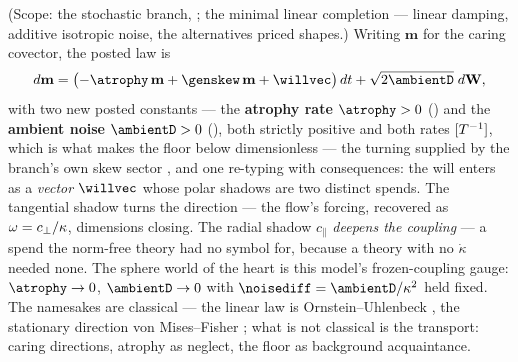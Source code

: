 \documentclass[../main]{subfiles}
\begin{document}
\begin{definition}%
%
  (Scope: the stochastic branch, ; the minimal linear completion ---
  linear damping, additive isotropic noise, the alternatives priced shapes.) Writing
  $\mathbf m$ for the caring covector, the posted law is
  \begin{equation}
    d\mathbf m
      =\bigl(-\atrophy\,\mathbf m+\genskew\,\mathbf m+\willvec\bigr)\,dt
      +\sqrt{2\ambientD}\;d\mathbf W,
    \label{eq:dyn:polar}
  \end{equation}
  with two new posted constants --- the \textbf{atrophy rate} $\atrophy>0$ ()
  and the \textbf{ambient noise} $\ambientD>0$ (), both strictly positive and
  both rates $[T\sp{-1}]$, which is what makes the floor below dimensionless --- the
  turning supplied by
  the branch's own skew sector , and one re-typing with consequences:
  the will enters as a \emph{vector} $\willvec$ whose polar shadows are two distinct
  spends. The tangential shadow turns the direction --- the flow's forcing, recovered
  as $\omega=c_{\perp}/\kappa$, dimensions closing. The radial shadow $c_{\parallel}$
  \emph{deepens the coupling} --- a spend the norm-free theory had no symbol for,
  because a theory with no $\dot\kappa$ needed none. The sphere world of the heart is
  this model's frozen-coupling gauge: $\atrophy\to0$, $\ambientD\to0$ with
  $\noisediff=\ambientD/\kappa^{2}$ held fixed. The namesakes are classical --- the
  linear law is Ornstein--Uhlenbeck \parencite{a:ou}, the stationary direction von
  Mises--Fisher \parencite{a:vmf}; what is not classical is the transport: caring
  directions, atrophy as neglect, the floor as background acquaintance.
\end{definition}
\end{document}
